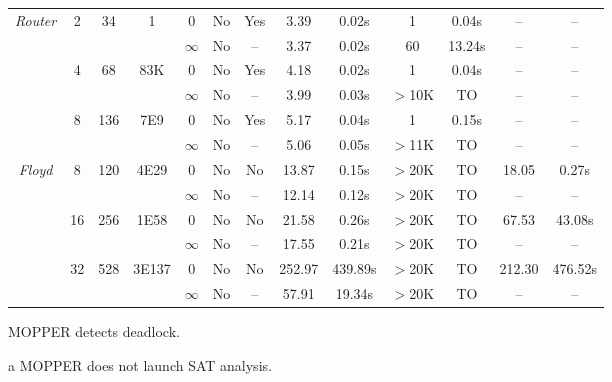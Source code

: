 \begin{savenotes}
\begin{table*}[t]
\begin{center}
\begin{threeparttable}
\begin{tabular}{|c|c|c|c|c|c|c||c|c||c|c||c|c|}
            \multirow{6}{*}{\textit{Router}} & \multirow{2}{*}{2} & \multirow{2}{*}{34} &  \multirow{2}{*}{1} 
          												     & 0 & No & Yes & 3.39 & 0.02s & 1 & 0.04s & -- & -- \tnote{a}\\ \cline{5-13}
          						       &                            & &  &  $\infty$ & No & -- & 3.37 & 0.02s & 60 & 13.24s &  -- & --\\ \cline{2-13}
						       		& \multirow{2}{*}{4} & \multirow{2}{*}{68} &  \multirow{2}{*}{83K} 
          												     & 0 & No & Yes & 4.18 & 0.02s & 1 & 0.04s & -- & --\tnote{a}\\ \cline{5-13}
          						       &                            & &  &  $\infty$ & No & -- & 3.99 & 0.03s & $>$10K & TO &  -- & --\\ \cline{2-13}
						              & \multirow{2}{*}{8} & \multirow{2}{*}{136} &  \multirow{2}{*}{7E9} 
          												     & 0 & No & Yes & 5.17 & 0.04s & 1 & 0.15s & -- & --\tnote{a}\\ \cline{5-13}
          						       &                            & &  &  $\infty$ & No & -- & 5.06 & 0.05s & $>$11K & TO & --  & --\\ \hline
						       \hline
						       
	    \multirow{6}{*}{\textit{Floyd}} & \multirow{2}{*}{8} & \multirow{2}{*}{120} &  \multirow{2}{*}{4E29} 
          												     & 0 & No & No & 13.87 & 0.15s & $>$20K & TO & 18.05 & 0.27s\\ \cline{5-13}
          						       &                            & &  &  $\infty$ & No & -- & 12.14 & 0.12s & $>$20K & TO &  -- & --\\ \cline{2-13}
						       		& \multirow{2}{*}{16} & \multirow{2}{*}{256} &  \multirow{2}{*}{1E58} 
          												     & 0 & No & No & 21.58 & 0.26s & $>$20K & TO & 67.53 & 43.08s\\ \cline{5-13}
          						       &                            & &  &  $\infty$ & No & -- & 17.55 & 0.21s & $>$20K & TO &  -- & --\\ \cline{2-13}
						              & \multirow{2}{*}{32} & \multirow{2}{*}{528} &  \multirow{2}{*}{3E137} 
          												     & 0 & No & No & 252.97 & 439.89s & $>$20K & TO & 212.30 & 476.52s\\ \cline{5-13}
          						       &                            & &  &  $\infty$ & No & -- & 57.91 & 19.34s & $>$20K & TO & --  & --\\ \hline
         
\end{tabular}
\begin{tablenotes}
\item[\textdagger] MOPPER detects deadlock. 
\item[a] MOPPER does not launch SAT analysis.
\end{tablenotes}
     \end{threeparttable}
\end{center}
\end{table*}
\end{savenotes}


